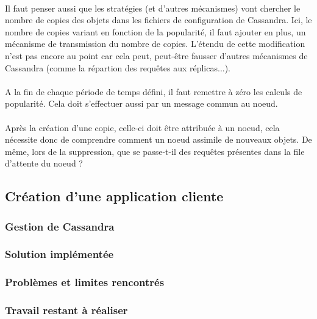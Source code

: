 \documentclass[12pt]{article}
\begin{document}
\paragraph{}Il faut penser aussi que les stratégies (et d'autres mécanismes) vont chercher le nombre de copies des objets dans les fichiers de configuration de Cassandra. Ici, le nombre de copies variant en fonction de la popularité, il faut ajouter en plus, un mécanisme de transmission du nombre de copies. L'étendu de cette modification n'est pas encore au point car cela peut, peut-être fausser d'autres mécanismes de Cassandra (comme la répartion des requêtes aux réplicas...).

\paragraph{}A la fin de chaque période de temps défini, il faut remettre à zéro les calculs de popularité. Cela doit s'effectuer aussi par un message commun au noeud.

\paragraph{}Après la création d'une copie, celle-ci doit être attribuée à un noeud, cela nécessite donc de comprendre comment un noeud assimile de nouveaux objets. De même, lors de la suppression, que se passe-t-il des requêtes présentes dans la file d'attente du noeud ?

\subsection{Création d'une application cliente}

\subsubsection{Gestion de Cassandra}

\subsubsection*{Solution implémentée}
\subsubsection*{Problèmes et limites rencontrés}
\subsubsection*{Travail restant à réaliser}
\end{document}
